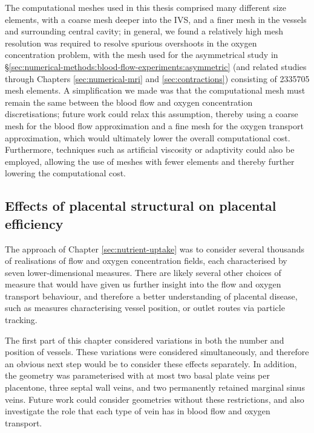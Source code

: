             The computational meshes used in this thesis comprised many different size elements, with a coarse mesh deeper into the IVS, and a finer mesh in the vessels and surrounding central cavity; in general, we found a relatively high mesh resolution was required to resolve spurious overshoots in the oxygen concentration problem, with the mesh used for the asymmetrical study in \S\ref{sec:numerical-methods:blood-flow-experiments:asymmetric} (and related studies through Chapters \ref{sec:numerical-mri} and \ref{sec:contractions}) consisting of \num{2335705} mesh elements. A simplification we made was that the computational mesh must remain the same between the blood flow and oxygen concentration discretisations; future work could relax this assumption, thereby using a coarse mesh for the blood flow approximation and a fine mesh for the oxygen transport approximation, which would ultimately lower the overall computational cost. Furthermore, techniques such as artificial viscosity or adaptivity could also be employed, allowing the use of meshes with fewer elements and thereby further lowering the computational cost.

        \subsection{Effects of placental structural on placental efficiency}
            The approach of Chapter \ref{sec:nutrient-uptake} was to consider several thousands of realisations of flow and oxygen concentration fields, each characterised by seven lower-dimensional measures. There are likely several other choices of measure that would have given us further insight into the flow and oxygen transport behaviour, and therefore a better understanding of placental disease, such as measures characterising vessel position, or outlet routes via particle tracking.

            The first part of this chapter considered variations in both the number and position of vessels. These variations were considered simultaneously, and therefore an obvious next step would be to consider these effects separately. In addition, the geometry was parameterised with at most two basal plate veins per placentone, three septal wall veins, and two permanently retained marginal sinus veins. Future work could consider geometries without these restrictions, and also investigate the role that each type of vein has in blood flow and oxygen transport.

